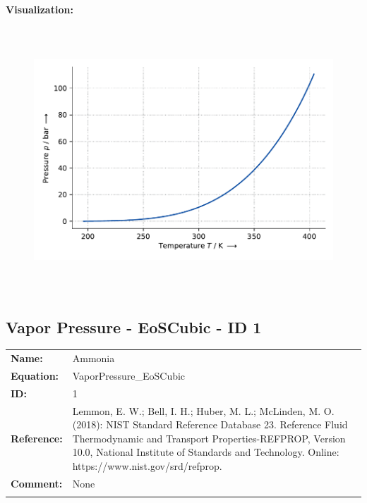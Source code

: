 \textbf{Visualization:}
%
\begin{figure}[!htp]
{\noindent\includegraphics[height=10cm, keepaspectratio]{figs/ref/ref_Ammonia_VaporPressure_EoS1_1.pdf}}
\end{figure}
%

\FloatBarrier
\newpage
\subsection{Vapor Pressure - EoSCubic - ID 1}
%
\begin{tabular}[l]{|lp{11.5cm}|}
\hline
\addlinespace

\textbf{Name:} & Ammonia \\
\textbf{Equation:} & VaporPressure\_EoSCubic \\
\textbf{ID:} & 1 \\
\textbf{Reference:} & Lemmon, E. W.; Bell, I. H.; Huber, M. L.; McLinden, M. O. (2018): NIST Standard Reference Database 23. Reference Fluid Thermodynamic and Transport Properties-REFPROP, Version 10.0, National Institute of Standards and Technology. Online: https://www.nist.gov/srd/refprop. \\
\textbf{Comment:} & None \\

\addlinespace
\hline
\end{tabular}
\newline

